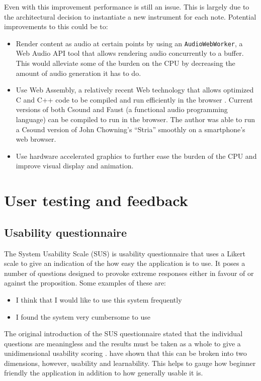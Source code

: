 \documentclass[12pt]{report}
\begin{document}
Even with this improvement performance is still an issue. This is largely due to
the architectural decision to instantiate a new instrument for each note.
Potential improvements to this could be to:
\begin{itemize}
\item Render content as audio at certain points by using an \texttt{AudioWebWorker}, a Web
Audio API tool that allows rendering audio concurrently to a buffer. This
would alleviate some of the burden on the CPU by decreasing the amount of
audio generation it has to do.
\item Use Web Assembly, a relatively recent Web technology that allows optimized C
and C++ code to be compiled and run efficiently in the browser
\cite{adenot_web_2017}. Current versions of both Csound and Faust (a
functional audio programming language) can be compiled to run in the browser.
The author was able to run a Csound version of John Chowning's ``Stria''
smoothly on a smartphone's web browser.
\item Use hardware accelerated graphics to further ease the burden of the CPU and
improve visual display and animation.
\end{itemize}

\chapter{User testing and feedback}
\label{sec:orgcdde6a8}
\section{Usability questionnaire}
\label{sec:orge61aeb6}
The System Usability Scale (SUS) is usability questionnaire that uses a Likert
scale to give an indication of the how easy the application is to use. It poses
a number of questions designed to provoke extreme responses either in favour of
or against the proposition. Some examples of these are:
\begin{itemize}
\item I think that I would like to use this system frequently
\item I found the system very cumbersome to use
\end{itemize}
The original introduction of the SUS questionnaire stated that the individual
questions are meaningless and the results must be taken as a whole to give a
unidimensional usability scoring \citep{brook_sus_1995}.
\citet{lewis_factor_2009} have shown that this can be broken into two
dimensions, however, usability and learnability. This helps to gauge how
beginner friendly the application in addition to how generally usable it is.
\end{document}

